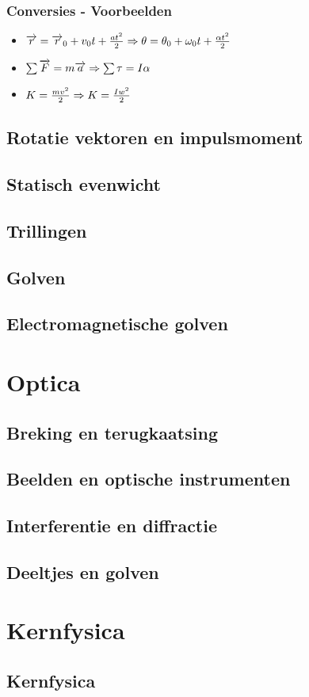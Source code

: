 \documentclass[12pt]{report}
\begin{document}
\section{Conversies - Voorbeelden}
\begin{itemize}
 \item $\overrightarrow{r} = \overrightarrow{r}_0 + v_0t + \frac{at^{2}}{2} 
 \\ \Rightarrow \theta = \theta_0 + \omega_0t + \frac{\alpha t^{2}}{2}$
 \item $\sum \overrightarrow{F} = m\overrightarrow{a}
 \\ \Rightarrow \sum \tau = I\alpha$
 \item $K = \frac{mv^{2}}{2}
 \\ \Rightarrow K = \frac{Iw^{2}}{2}$
\end{itemize}




\chapter{Rotatie vektoren en impulsmoment}

\chapter{Statisch evenwicht}

\chapter{Trillingen}

\chapter{Golven}

\chapter{Electromagnetische golven}

\part{Optica}

\chapter{Breking en terugkaatsing}

\chapter{Beelden en optische instrumenten}

\chapter{Interferentie en diffractie}

\chapter{Deeltjes en golven}

\part{Kernfysica}
\chapter{Kernfysica}
\end{document}
